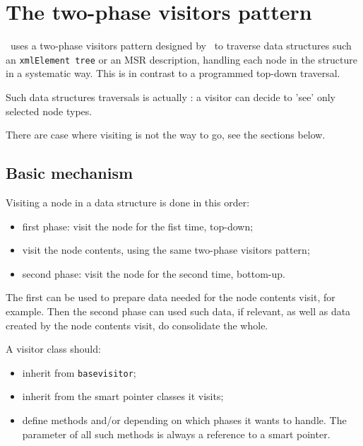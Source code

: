 
\chapter{The two-phase visitors pattern}

\mf\ uses a two-phase visitors pattern designed by \fober\ to traverse data structures such an {\tt xmlElement tree} or an MSR description, handling each node in the structure in a systematic way. This is in contrast to a programmed top-down traversal.

Such data structures traversals is actually : a visitor can decide to 'see' only selected node types.

There are case where visiting is not the way to go, see the sections below.


\section{Basic mechanism}

Visiting a node in a data structure is done in this order:
\begin{itemize}
\item first phase: visit the node for the fist time, top-down;
\item visit the node contents, using the same two-phase visitors pattern;
\item second phase: visit the node for the second time, bottom-up.
\end{itemize}

The first can be used to prepare data needed for the node contents visit, for example.
Then the second phase can used such data, if relevant, as well as data created by the node contents visit, do consolidate the whole.

A visitor class should:
\begin{itemize}
\item inherit from {\tt basevisitor};
\item inherit from the smart pointer classes it visits;
\item define methods  and/or  depending on which phases it wants to handle. The parameter of all such  methods is always a reference to a smart pointer.
\end{itemize}

